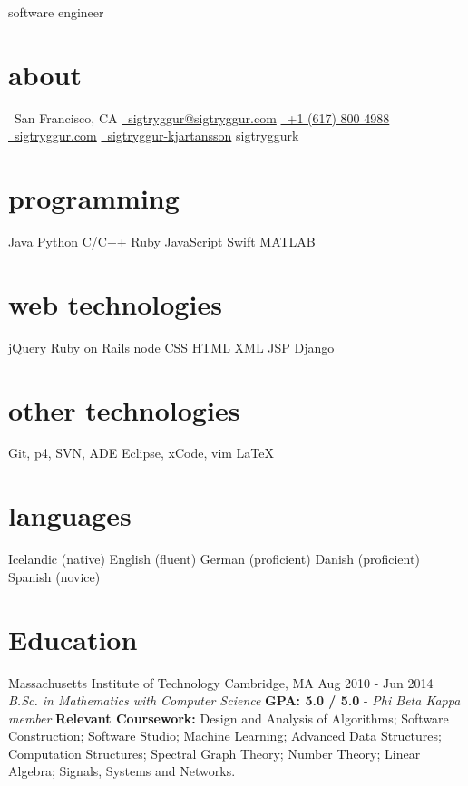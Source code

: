 \documentclass[]{friggeri-cv}
\begin{document}
       {software engineer}


\begin{aside}
  \section{about}
    \faHome~San Francisco, CA
     \href{mailto:sigtryggur@sigtryggur.com}{\faEnvelope~sigtryggur@sigtryggur.com}
    \href{tel:16178004988}{\faMobilePhone~+1 (617) 800 4988}
    \href{http://sigtryggur.com}{\faGlobe~sigtryggur.com}
    \href{https://www.linkedin.com/pub/sigtryggur-kjartansson/47/96/6aa}{\faLinkedinSign~sigtryggur-kjartansson}
    \href{https://github.com/sigtryggurk}{\faGithub} \href{http://facebook.com/sigtryggurk}{\faFacebookSign} \href{https://twitter.com/sigtryggurk}{\faTwitter} sigtryggurk
  \section{programming}
    Java
    Python
    C/C++
    Ruby
    JavaScript
    Swift
    MATLAB
  \section{web technologies}
    jQuery
    Ruby on Rails
    node
    CSS
    HTML
    XML
    JSP
    Django
   \section{other technologies}
    Git, p4, SVN, ADE
    Eclipse, xCode, vim
    LaTeX
   \section{languages}
    Icelandic (native)
    English (fluent)
    German (proficient)
    Danish (proficient)
    Spanish (novice)
\end{aside}

\section{Education}

\begin{entrylist}
  \eduentry
    {Massachusetts Institute of Technology}
    {Cambridge, MA}
    {Aug 2010 - Jun 2014}
    {\emph{B.Sc. in Mathematics with Computer Science}}
    {\textbf{GPA: 5.0 / 5.0} - \textit{Phi Beta Kappa member}}
    {\textbf{Relevant Coursework:} Design and Analysis of Algorithms; Software Construction; Software
Studio; Machine Learning; Advanced Data Structures; Computation Structures; Spectral Graph Theory; Number Theory; Linear Algebra; Signals, Systems and Networks.}
\end{entrylist}
\end{document}
